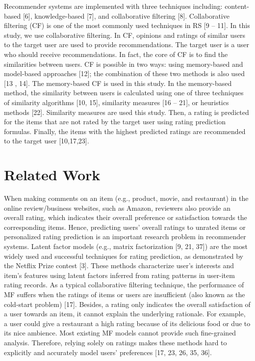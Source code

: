 \documentclass[10pt,conference]{IEEEtran}
\begin{document}
Recommender systems are implemented with three techniques including: content-based [6], knowledge-based [7], and collaborative filtering [8]. Collaborative filtering (CF) is one of the most commonly used techniques in RS [9 – 11]. In this study, we use collaborative filtering. In CF, opinions and ratings of similar users to the target user are used to provide recommendations. The target user is a user who should receive recommendations. In fact, the core of CF is to find the similarities between users. CF is possible in two ways: using memory-based and model-based approaches [12]; the combination of these two methods is also used [13 , 14]. The memory-based CF is used in this study. In the memory-based method, the similarity between users is calculated using one of three techniques of similarity algorithms [10, 15], similarity measures [16 – 21], or heuristics methods [22]. Similarity measures are used this study. Then, a rating is predicted for the items that are not rated by the target user using rating prediction formulas. Finally, the items with the highest predicted ratings are recommended to the target user [10,17,23].


\section{Related Work}
When making comments on an item (e.g., product, movie, and restaurant) in the online review/business websites, such as Amazon, reviewers also provide an overall rating, which indicates their overall preference or satisfaction towards the corresponding items. Hence, predicting users' overall ratings to unrated items or personalized rating prediction is an important research problem in recommender systems. Latent factor models (e.g., matrix factorization [9, 21, 37]) are the most widely used and successful techniques for rating prediction, as demonstrated by the Netflix Prize contest [3]. These methods characterize user's interests and item's features using latent factors inferred from rating patterns in user-item rating records. As a typical collaborative filtering technique, the performance of MF suffers when the ratings of items or users are insufficient (also known as the cold-start problem) [17]. Besides, a rating only indicates the overall satisfaction of a user towards an item, it cannot explain the underlying rationale. For example, a user could give a restaurant a high rating because of its delicious food or due to its nice ambience. Most existing MF models cannot provide such fine-grained analysis. Therefore, relying solely on ratings makes these methods hard to explicitly and accurately model users' preferences [17, 23, 26, 35, 36].
\end{document}
